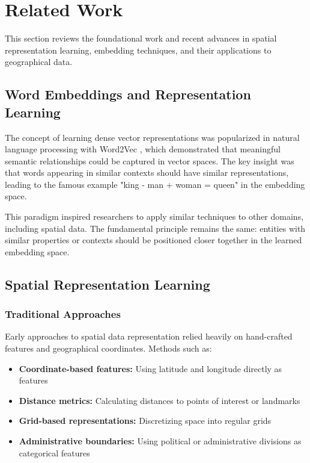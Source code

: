 \section{Related Work}
\label{sec:related_work}

This section reviews the foundational work and recent advances in spatial representation learning, embedding techniques, and their applications to geographical data.

\subsection{Word Embeddings and Representation Learning}

The concept of learning dense vector representations was popularized in natural language processing with Word2Vec \cite{mikolov2013word2vec}, which demonstrated that meaningful semantic relationships could be captured in vector spaces. The key insight was that words appearing in similar contexts should have similar representations, leading to the famous example "king - man + woman = queen" in the embedding space.

This paradigm inspired researchers to apply similar techniques to other domains, including spatial data. The fundamental principle remains the same: entities with similar properties or contexts should be positioned closer together in the learned embedding space.

\subsection{Spatial Representation Learning}

\subsubsection{Traditional Approaches}

Early approaches to spatial data representation relied heavily on hand-crafted features and geographical coordinates. Methods such as:

\begin{itemize}
    \item \textbf{Coordinate-based features:} Using latitude and longitude directly as features
    \item \textbf{Distance metrics:} Calculating distances to points of interest or landmarks
    \item \textbf{Grid-based representations:} Discretizing space into regular grids
    \item \textbf{Administrative boundaries:} Using political or administrative divisions as categorical features
\end{itemize}

